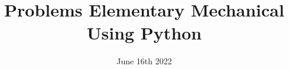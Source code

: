 \documentclass[openany]{book}
\title{Problems Elementary Mechanical Using Python}
\date{June 16th 2022}
\begin{document}
    \maketitle
    \tableofcontents
    \lstlistoflistings
    
    
    
\end{document}
